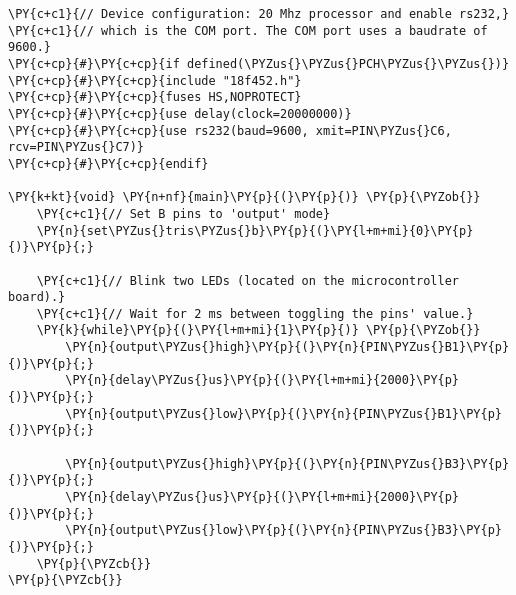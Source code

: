 \begin{Verbatim}[commandchars=\\\{\}]
\PY{c+c1}{// Device configuration: 20 Mhz processor and enable rs232,}
\PY{c+c1}{// which is the COM port. The COM port uses a baudrate of 9600.}
\PY{c+cp}{#}\PY{c+cp}{if defined(\PYZus{}\PYZus{}PCH\PYZus{}\PYZus{})}
\PY{c+cp}{#}\PY{c+cp}{include "18f452.h"}
\PY{c+cp}{#}\PY{c+cp}{fuses HS,NOPROTECT}
\PY{c+cp}{#}\PY{c+cp}{use delay(clock=20000000)}
\PY{c+cp}{#}\PY{c+cp}{use rs232(baud=9600, xmit=PIN\PYZus{}C6, rcv=PIN\PYZus{}C7)}
\PY{c+cp}{#}\PY{c+cp}{endif}

\PY{k+kt}{void} \PY{n+nf}{main}\PY{p}{(}\PY{p}{)} \PY{p}{\PYZob{}}
    \PY{c+c1}{// Set B pins to 'output' mode}
    \PY{n}{set\PYZus{}tris\PYZus{}b}\PY{p}{(}\PY{l+m+mi}{0}\PY{p}{)}\PY{p}{;}

    \PY{c+c1}{// Blink two LEDs (located on the microcontroller board).}
    \PY{c+c1}{// Wait for 2 ms between toggling the pins' value.}
    \PY{k}{while}\PY{p}{(}\PY{l+m+mi}{1}\PY{p}{)} \PY{p}{\PYZob{}}
        \PY{n}{output\PYZus{}high}\PY{p}{(}\PY{n}{PIN\PYZus{}B1}\PY{p}{)}\PY{p}{;}
        \PY{n}{delay\PYZus{}us}\PY{p}{(}\PY{l+m+mi}{2000}\PY{p}{)}\PY{p}{;}
        \PY{n}{output\PYZus{}low}\PY{p}{(}\PY{n}{PIN\PYZus{}B1}\PY{p}{)}\PY{p}{;}

        \PY{n}{output\PYZus{}high}\PY{p}{(}\PY{n}{PIN\PYZus{}B3}\PY{p}{)}\PY{p}{;}
        \PY{n}{delay\PYZus{}us}\PY{p}{(}\PY{l+m+mi}{2000}\PY{p}{)}\PY{p}{;}
        \PY{n}{output\PYZus{}low}\PY{p}{(}\PY{n}{PIN\PYZus{}B3}\PY{p}{)}\PY{p}{;}
    \PY{p}{\PYZcb{}}
\PY{p}{\PYZcb{}}
\end{Verbatim}
